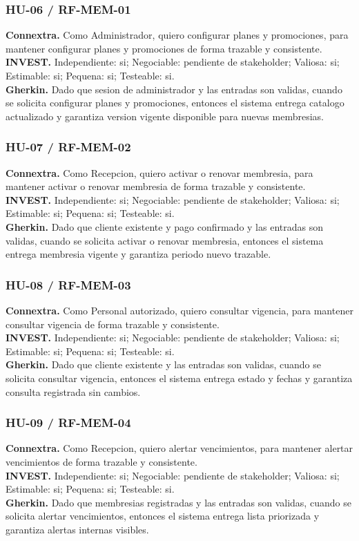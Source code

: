 \documentclass[11pt,a4paper,twoside]{article}
\begin{document}
\subsubsection{HU-06 / RF-MEM-01}
\textbf{Connextra.} Como Administrador, quiero configurar planes y promociones, para mantener configurar planes y promociones de forma trazable y consistente.\\
\textbf{INVEST.} Independiente: si; Negociable: pendiente de stakeholder; Valiosa: si; Estimable: si; Pequena: si; Testeable: si.\\
\textbf{Gherkin.} Dado que sesion de administrador y las entradas son validas, cuando se solicita configurar planes y promociones, entonces el sistema entrega catalogo actualizado y garantiza version vigente disponible para nuevas membresias.

\subsubsection{HU-07 / RF-MEM-02}
\textbf{Connextra.} Como Recepcion, quiero activar o renovar membresia, para mantener activar o renovar membresia de forma trazable y consistente.\\
\textbf{INVEST.} Independiente: si; Negociable: pendiente de stakeholder; Valiosa: si; Estimable: si; Pequena: si; Testeable: si.\\
\textbf{Gherkin.} Dado que cliente existente y pago confirmado y las entradas son validas, cuando se solicita activar o renovar membresia, entonces el sistema entrega membresia vigente y garantiza periodo nuevo trazable.

\subsubsection{HU-08 / RF-MEM-03}
\textbf{Connextra.} Como Personal autorizado, quiero consultar vigencia, para mantener consultar vigencia de forma trazable y consistente.\\
\textbf{INVEST.} Independiente: si; Negociable: pendiente de stakeholder; Valiosa: si; Estimable: si; Pequena: si; Testeable: si.\\
\textbf{Gherkin.} Dado que cliente existente y las entradas son validas, cuando se solicita consultar vigencia, entonces el sistema entrega estado y fechas y garantiza consulta registrada sin cambios.

\subsubsection{HU-09 / RF-MEM-04}
\textbf{Connextra.} Como Recepcion, quiero alertar vencimientos, para mantener alertar vencimientos de forma trazable y consistente.\\
\textbf{INVEST.} Independiente: si; Negociable: pendiente de stakeholder; Valiosa: si; Estimable: si; Pequena: si; Testeable: si.\\
\textbf{Gherkin.} Dado que membresias registradas y las entradas son validas, cuando se solicita alertar vencimientos, entonces el sistema entrega lista priorizada y garantiza alertas internas visibles.
\end{document}
